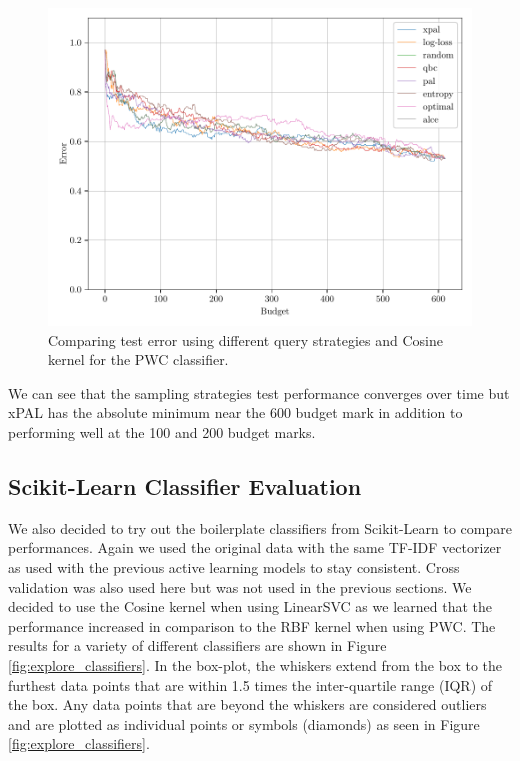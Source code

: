\begin{figure}[ht]
    \centering
    \includegraphics[width=\textwidth]{../img/plot_all_cos_test_results.pdf}
    \caption{Comparing test error using different query strategies and Cosine kernel for the PWC classifier.}
    \label{fig:cos_test_results}
\end{figure}

We can see that the sampling strategies test performance converges over time but xPAL has the absolute minimum near the 600 budget mark in addition to performing well at the 100 and 200 budget marks.


\subsection{Scikit-Learn Classifier Evaluation}

We also decided to try out the boilerplate classifiers from Scikit-Learn to compare performances. Again we used the original data with the same TF-IDF vectorizer as used with the previous active learning models to stay consistent. Cross validation was also used here but was not used in the previous sections. We decided to use the Cosine kernel when using LinearSVC as we learned that the performance increased in comparison to the RBF kernel when using PWC. The results for a variety of different classifiers are shown in Figure \ref{fig:explore_classifiers}. In the box-plot, the whiskers extend from the box to the furthest data points that are within 1.5 times the inter-quartile range (IQR) of the box. Any data points that are beyond the whiskers are considered outliers and are plotted as individual points or symbols (diamonds) as seen in Figure \ref{fig:explore_classifiers}.

